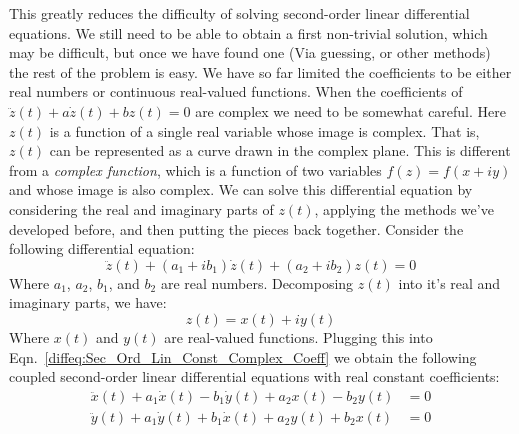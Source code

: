             This greatly reduces the difficulty of solving second-order linear
            differential equations. We still need to be able to obtain a first
            non-trivial solution, which may be difficult, but once we have found
            one (Via guessing, or other methods) the rest of the
            problem is easy. We have so far limited the coefficients to be
            either real numbers or continuous real-valued functions. When
            the coefficients of $\ddot{z}(t)+a\dot{z}(t)+bz(t)=0$ are
            complex we need to be somewhat careful. Here $z(t)$ is a
            function of a single real variable whose image is complex.
            That is, $z(t)$ can be represented as a curve
            drawn in the complex plane. This is different from a
            \textit{complex function}, which is a function of two variables
            $f(z)=f(x+iy)$ and whose image is also complex.
            We can solve this differential equation by
            considering the real and imaginary parts of $z(t)$, applying
            the methods we've developed before, and then putting the pieces
            back together. Consider the following differential equation:
            \begin{equation}
                \label{diffeq:Sec_Ord_Lin_Const_Complex_Coeff}
                \ddot{z}(t)+(a_{1}+ib_{1})\dot{z}(t)+(a_{2}+ib_{2})z(t)=0
            \end{equation}
            Where $a_{1}$, $a_{2}$, $b_{1}$, and $b_{2}$ are real numbers.
            Decomposing $z(t)$ into it's real and imaginary parts, we have:
            \begin{equation}
                \label{eqn:DIFFEQ:Real_And_Imag_Decomp_of_Comp_Func}
                z(t)=x(t)+iy(t)
            \end{equation}
            Where $x(t)$ and $y(t)$ are real-valued functions.
            Plugging this into
            Eqn.~\ref{diffeq:Sec_Ord_Lin_Const_Complex_Coeff}
            we obtain
            the following coupled second-order linear differential
            equations with real constant coefficients:
            \begin{subequations}
                \begin{align}
                    \label{eqn:DIFFEQ:Complex_second_order_Diffeq_1}
                    \ddot{x}(t)+a_{1}\dot{x}(t)-b_{1}\dot{y}(t)+
                    a_{2}x(t)-b_{2}y(t)&=0\\
                    \label{eqn:DIFFEQ:Complex_second_order_Diffeq_2}
                    \ddot{y}(t)+a_{1}\dot{y}(t)+b_{1}\dot{x}(t)+
                    a_{2}y(t)+b_{2}x(t)&=0
                \end{align}
            \end{subequations}
